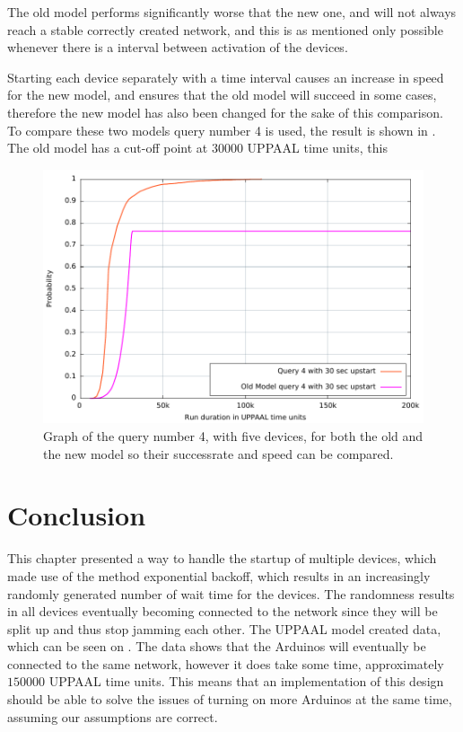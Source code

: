 The old model performs significantly worse that the new one, and will not always reach a stable correctly created network, and this is as mentioned only possible whenever there is a interval between activation of the devices.

Starting each device separately with a time interval causes an increase in speed for the new model, and ensures that the old model will succeed in some cases, therefore the new model has also been changed for the sake of this comparison. 
To compare these two models query number 4 is used, the result is shown in .
The old model has a cut-off point at $30 000$ UPPAAL time units, this

\begin{figure}[ht]
  \includegraphics[width=1\textwidth]{Figures/Graphs/gnuplot/uppaal_Compare/graph.pdf} 
\caption{Graph of the query number 4, with five devices, for both the old and the new model so their successrate and speed can be compared.}
\label{CompareGraph}
\end{figure}


\section{Conclusion}
This chapter presented a way to handle the startup of multiple devices, which made use of the method exponential backoff, which results in an increasingly randomly generated number of wait time for the devices. 
The randomness results in all devices eventually becoming connected to the network since they will be split up and thus stop jamming each other.
The UPPAAL model created data, which can be seen on .
The data shows that the Arduinos will eventually be connected to the same network, however it does take some time, approximately $150 000$ UPPAAL time units.
This means that an implementation of this design should be able to solve the issues of turning on more Arduinos at the same time, assuming our assumptions are correct.
